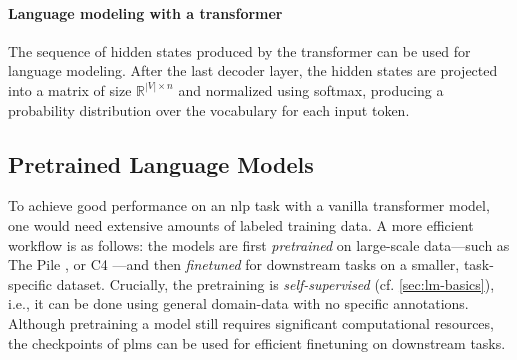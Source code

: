 {\paragraph{Language modeling with a transformer} The sequence of hidden states produced by the transformer can be used for language modeling. After the last decoder layer, the hidden states are projected into a matrix of size $\mathbb{R}^{|V|\times n}$ and normalized using softmax, producing a probability distribution over the vocabulary for each input token.

\subsection{Pretrained Language Models}
\label{sec:plms}
To achieve good performance on an \ac{nlp} task with a vanilla transformer model, one would need extensive amounts of labeled training data. A more efficient workflow is as follows: the models are first \emph{pretrained} on large-scale data---such as The Pile \cite{gao2020pile}, or C4 \cite{raffelExploringLimitsTransfer2019}---and then \emph{finetuned} for downstream tasks on a smaller, task-specific dataset. Crucially, the pretraining is \emph{self-supervised} (cf. \autoref{sec:lm-basics}), i.e., it can be done using general domain-data with no specific annotations. Although pretraining a model still requires significant computational resources, the checkpoints of \acp{plm} can be used for efficient finetuning on downstream tasks.


}
